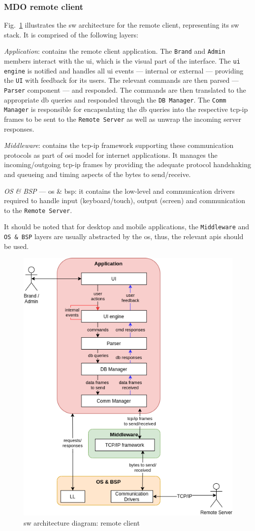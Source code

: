 \subsubsection{MDO remote client}
\label{sec:mdo-remote-client}
%
Fig.~\ref{fig:sw-arch-rc} illustrates the \gls{sw} architecture for the remote
client, representing its \gls{sw} stack.
It is comprised of the following layers:
\begin{item-c}
\item \emph{Application}: contains the remote client application. The
  \texttt{Brand} and \texttt{Admin} members interact with the \gls{ui}, which is
  the visual part of the interface. The \texttt{\gls{ui} engine} is notified and
  handles all \gls{ui} events --- internal or external --- providing the \texttt{UI}
  with feedback for its users. The relevant commands
  are then parsed --- \texttt{Parser} component --- and responded. The commands
  are then translated to the appropriate \gls{db} queries and responded through
  the \texttt{DB Manager}. The \texttt{Comm Manager} is responsible for
  encapsulating the \gls{db} queries into the respective \gls{tcp-ip} frames to
  be sent to the \texttt{Remote Server} as well as unwrap the incoming server
  responses.
\item \emph{Middleware}: contains the \gls{tcp-ip} framework supporting these
  communication protocols as part of \gls{osi} model for internet
  applications. It manages the incoming/outgoing \gls{tcp-ip} frames by
  providing the adequate protocol handshaking and queueing and timing aspects of
  the bytes to send/receive.
\item \emph{OS \& BSP} --- \gls{os} \& \gls{bsp}: it contains the low-level and
  communication drivers required to handle input (keyboard/touch), output
  (screen) and communication to the \texttt{Remote Server}.
\end{item-c}
It should be noted that for desktop and mobile applications, the
\texttt{Middleware} and \texttt{OS \& BSP} layers are usually abstracted by the
\gls{os}, thus, the relevant \gls{api}s should be used.
%
\begin{figure}[htb!]
\centering
    \includegraphics[width=0.55\columnwidth]{./img/sw-arch-rc.png}
  \caption{\gls{sw} architecture diagram: remote client}%
\label{fig:sw-arch-rc}
\end{figure}


